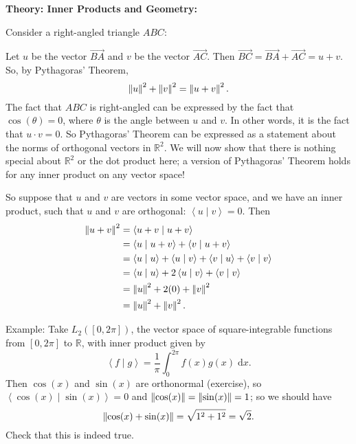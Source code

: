 \documentclass{article}
\newcommand{\diff}{\;\mathrm{d}}
\newcommand{\norm}[1]{\left|\kern-1pt\left|#1\right|\kern-1pt\right|}
\newcommand{\braket}[2]{\left\langle #1 \mid #2 \right\rangle}
\let\rarrow\overrightarrow
\begin{document}
\clearpage










\textbf{Theory: Inner Products and Geometry:}

\bigskip



Consider a right-angled triangle $ABC$:
\begin{center}
\end{center}

Let $u$ be the vector $\rarrow{BA}$ and $v$ be the vector $\rarrow{AC}$. Then $\rarrow{BC} = \rarrow{BA}+\rarrow{AC}=u+v$. So, by Pythagoras' Theorem,
\[\norm{u}^2+\norm{v}^2=\norm{u+v}^2.\]
The fact that $ABC$ is right-angled can be expressed by the fact that $\cos(\theta)=0$, where $\theta$ is the angle between $u$ and $v$. In other words, it is the fact that $u\cdot v=0$. So Pythagoras' Theorem can be expressed as a statement about the norms of orthogonal vectors in $\mathbb{R}^2$. We will now show that there is nothing special about $\mathbb{R}^2$ or the dot product here; a version of Pythagoras' Theorem holds for any inner product on any vector space!

So suppose that $u$ and $v$ are vectors in some vector space, and we have an inner product, such that $u$ and $v$ are orthogonal: $\braket{u}{v}=0$. Then
\begin{align*}
	\norm{u+v}^2 &= \braket{u+v}{u+v}\\
	&=\braket{u}{u+v} + \braket{v}{u+v}\\
	&= \braket{u}{u} + \braket{u}{v} + \braket{v}{u} + \braket{v}{v}\\
	&= \braket{u}{u} + 2 \braket{u}{v} + \braket{v}{v}\\
	&= \norm{u}^2 + 2(0) + \norm{v}^2\\
	&= \norm{u}^2+\norm{v}^2.
\end{align*}\medskip


Example: Take $L_2([0,2\pi])$, the vector space of square-integrable functions from $[0,2\pi]$ to $\mathbb{R}$, with inner product given by
\[\braket{f}{g}=\frac{1}{\pi}\int_0^{2\pi}f(x)g(x)\diff x.\]
Then $\cos(x)$ and $\sin(x)$ are orthonormal (exercise), so $\braket{\cos(x)}{\sin(x)}=0$ and $\norm{\cos(x)}=\norm{\sin(x)}=1$; so we should have
\[\norm{\cos(x)+\sin(x)}=\sqrt{1^2 +1^2}=\sqrt{2}.\]
Check that this is indeed true.
\end{document}
